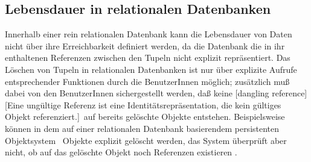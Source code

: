 \subsection{Lebensdauer in relationalen Datenbanken}
%
Innerhalb einer rein relationalen Datenbank kann die Lebensdauer von
Daten nicht \"{u}ber ihre Erreichbarkeit definiert werden, da die
Datenbank die in ihr enthaltenen Referenzen zwischen den Tupeln nicht
explizit repr\"{a}sentiert. Das L\"{o}schen von Tupeln in relationalen
Datenbanken ist nur \"{u}ber explizite Aufrufe entsprechender Funktionen
durch die BenutzerInnen m\"{o}glich; zus\"{a}tzlich mu\ss{} dabei von den
BenutzerInnen sichergestellt werden, da\ss{} keine
%
[dangling reference][Eine
un\-g\"{u}l\-ti\-ge Referenz ist eine
Iden\-ti\-t\"{a}ts\-re\-pr\"{a}\-sen\-ta\-tion, die kein g\"{u}ltiges Objekt
referenziert.]\ auf bereits gel\"{o}schte Objekte
entstehen. Beispielsweise k\"{o}nnen in dem auf einer relationalen
Datenbank basierendem persistenten Objektsystem \pclos\ Objekte
explizit ge\-l\"{o}scht werden, das System \"{u}berpr\"{u}ft aber nicht, ob auf
das gel\"{o}schte Objekt noch Referenzen existieren
\cite[]{bib:pa91a}.
%
